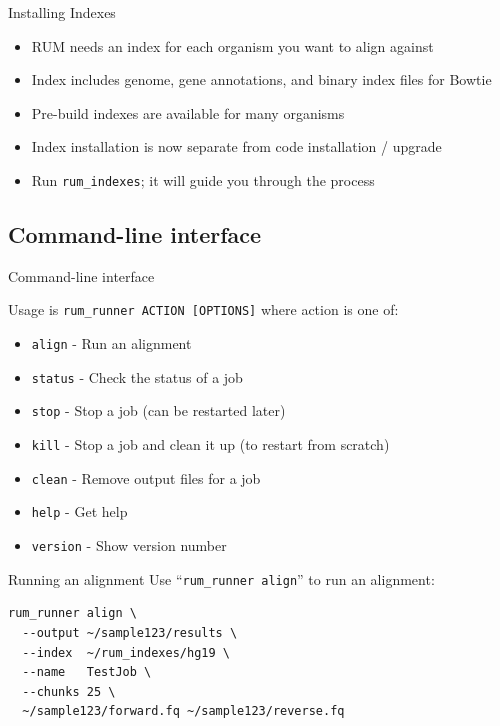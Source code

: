 \documentclass{beamer}
\begin{document}
\begin{frame}{Installing Indexes}
  \begin{itemize}
  \item RUM needs an index for each organism you want to align against
  \item Index includes genome, gene annotations, and binary index files for Bowtie
  \item Pre-build indexes are available for many organisms
  \item Index installation is now separate from code installation / upgrade
  \item Run \texttt{rum\_indexes}; it will guide you through the process
  \end{itemize}
\end{frame}

\subsection{Command-line interface}

\begin{frame}{Command-line interface}

  Usage is \texttt{rum\_runner ACTION [OPTIONS]} where action is one of:

  \begin{itemize}
  \item \texttt{align} - Run an alignment
  \item \texttt{status} - Check the status of a job
  \item \texttt{stop} - Stop a job (can be restarted later)
  \item \texttt{kill} - Stop a job and clean it up (to restart from scratch)
  \item \texttt{clean} - Remove output files for a job
  \item \texttt{help} - Get help
  \item \texttt{version} - Show version number
  \end{itemize}

\end{frame}

\begin{frame}[fragile]{Running an alignment}
Use ``\texttt{rum\_runner align}'' to run an alignment:
\begin{verbatim}
rum_runner align \
  --output ~/sample123/results \
  --index  ~/rum_indexes/hg19 \
  --name   TestJob \
  --chunks 25 \
  ~/sample123/forward.fq ~/sample123/reverse.fq
\end{verbatim}
\end{frame}
\end{document}
